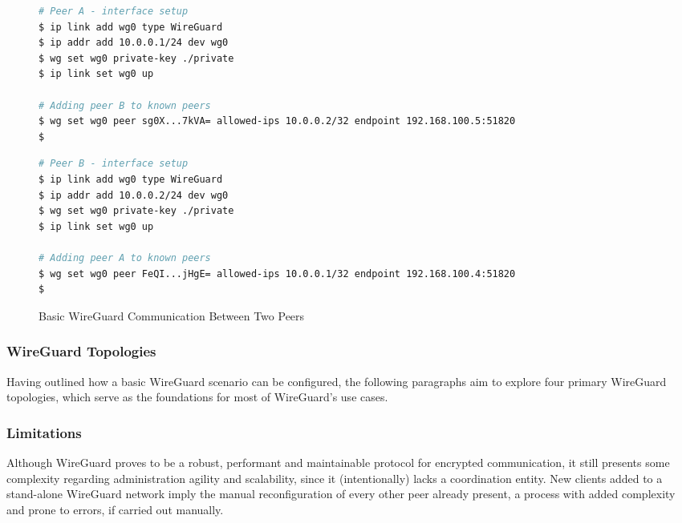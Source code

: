 \documentclass[11pt,twoside,a4paper]{report}
\begin{document}
\begin{figure}
\begin{multicols}{2}
\begin{lstlisting}[language=sh, frame=single, breaklines=true, breakatwhitespace=true, basicstyle=\small]
# Peer A - interface setup
$ ip link add wg0 type WireGuard
$ ip addr add 10.0.0.1/24 dev wg0
$ wg set wg0 private-key ./private
$ ip link set wg0 up

# Adding peer B to known peers
$ wg set wg0 peer sg0X...7kVA= allowed-ips 10.0.0.2/32 endpoint 192.168.100.5:51820
$

\end{lstlisting}
\columnbreak
\begin{lstlisting}[language=sh, frame=single, breaklines=true, breakatwhitespace=true, basicstyle=\small]
# Peer B - interface setup
$ ip link add wg0 type WireGuard
$ ip addr add 10.0.0.2/24 dev wg0
$ wg set wg0 private-key ./private
$ ip link set wg0 up

# Adding peer A to known peers
$ wg set wg0 peer FeQI...jHgE= allowed-ips 10.0.0.1/32 endpoint 192.168.100.4:51820
$

\end{lstlisting}
\end{multicols}
\caption{Basic WireGuard Communication Between Two Peers}
\label{fig:wgconf}
\end{figure}

\subsubsection{WireGuard Topologies}

Having outlined how a basic WireGuard scenario can be configured, the following paragraphs aim to explore four primary WireGuard topologies, which serve as the foundations for most of WireGuard's use cases.


\subsubsection{Limitations}
\label{sec:wglimits}

Although WireGuard proves to be a robust, performant and maintainable protocol for encrypted communication, it still presents some complexity regarding administration agility and scalability, since it (intentionally) lacks a coordination entity. New clients added to a stand-alone WireGuard network imply the manual reconfiguration of every other peer already present, a process with added complexity and prone to errors, if carried out manually.
\end{document}
